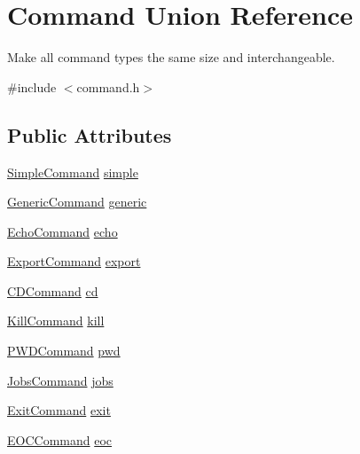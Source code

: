 \hypertarget{unionCommand}{\section{Command Union Reference}
\label{unionCommand}
}


Make all command types the same size and interchangeable.  




{\ttfamily \#include $<$command.\-h$>$}

\subsection*{Public Attributes}
\begin{DoxyCompactItemize}
\item 
\hyperlink{structSimpleCommand}{Simple\-Command} \hyperlink{unionCommand_a269da4d9b16689de14a0ec83636b59e8}{simple}
\item 
\hyperlink{structGenericCommand}{Generic\-Command} \hyperlink{unionCommand_a22a7dad0e3935c261a1643c8c5ea46aa}{generic}
\item 
\hyperlink{command_8h_a8dc22d719c880c1ffcd9bc2dc5773633}{Echo\-Command} \hyperlink{unionCommand_a74de4769cc35dac9a3f7dfd24cb87ad7}{echo}
\item 
\hyperlink{structExportCommand}{Export\-Command} \hyperlink{unionCommand_a57e7a8eb0763aa7105d3bc6a52e59da3}{export}
\item 
\hyperlink{structCDCommand}{C\-D\-Command} \hyperlink{unionCommand_a488c8f6e6ce10f7c9126f37c5f37776d}{cd}
\item 
\hyperlink{structKillCommand}{Kill\-Command} \hyperlink{unionCommand_a19c5261961f2f9a7fcbf9f5379d3f98a}{kill}
\item 
\hyperlink{command_8h_a0c0e44e3e2b07b1e9b48023205cb4ca2}{P\-W\-D\-Command} \hyperlink{unionCommand_a34fc21bb2a7fee2df4d3674b9d8166ff}{pwd}
\item 
\hyperlink{command_8h_a027de4ed5fe4b0313c6c8ee0c2c1806b}{Jobs\-Command} \hyperlink{unionCommand_abeb4905f11baf90a800fe211dd5ecdc9}{jobs}
\item 
\hyperlink{command_8h_a354cb87bc40859e5595de56b675732bc}{Exit\-Command} \hyperlink{unionCommand_ab516bde009e6b06c4b342d7f5bf35ece}{exit}
\item 
\hyperlink{command_8h_ae5bf5cf7a34428c221f28179034dd125}{E\-O\-C\-Command} \hyperlink{unionCommand_a062a1645e04deb34460595c902a49c44}{eoc}
\end{DoxyCompactItemize}


